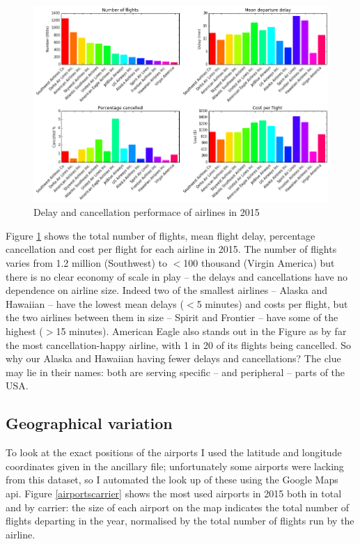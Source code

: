 \documentclass[a4paper]{article}
\begin{document}
\begin{figure}[h]
\centering
\includegraphics[width=\textwidth]{../figures/exploration/cost_carrier.png}
\caption{Delay and cancellation performace of airlines in 2015}
\label{costbycarrier}
\end{figure}

Figure \ref{costbycarrier} shows the total number of flights, mean flight delay, percentage cancellation and cost per flight for each airline in 2015. The number of flights varies from 1.2 million (Southwest) to $<$100 thousand (Virgin America) but there is no clear economy of scale in play -- the delays and cancellations have no dependence on airline size. Indeed two of the smallest airlines -- Alaska and Hawaiian -- have the lowest mean delays ($<$5 minutes) and costs per flight, but the two airlines between them in size -- Spirit and Frontier -- have some of the highest ($>$15 minutes). American Eagle also stands out in the Figure as by far the most cancellation-happy airline, with 1 in 20 of its flights being cancelled. So why our Alaska and Hawaiian having fewer delays and cancellations? The clue may lie in their names: both are serving specific -- and peripheral -- parts of the USA.

\subsection*{Geographical variation}

To look at the exact positions of the airports I used the latitude and longitude coordinates given in the ancillary file; unfortunately some airports were lacking from this dataset, so I automated the look up of these using the Google Maps api.\footnotemark[3] Figure \ref{airportscarrier} shows the most used airports in 2015 both in total and by carrier: the size of each airport on the map indicates the total number of flights departing in the year, normalised by the total number of flights run by the airline. 
\end{document}
